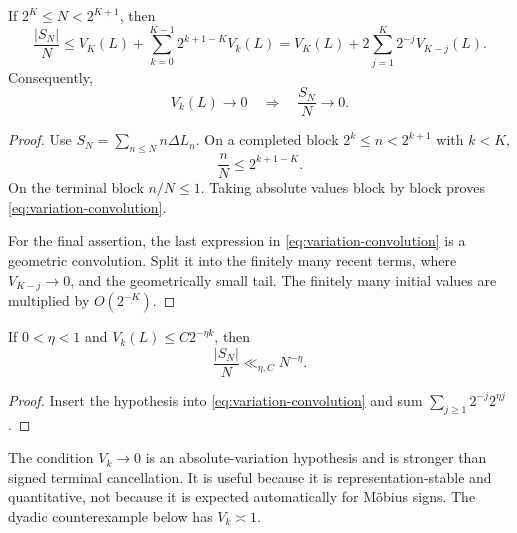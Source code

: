 \begin{theorem}
\label{thm:variation-convolution}
If \(2^K\le N<2^{K+1}\), then
\begin{equation}
 \boxed{\quad
 \frac{|S_N|}{N}
 \le
 V_K(L)+
 \sum_{k=0}^{K-1}2^{k+1-K}V_k(L)
 =
 V_K(L)+2\sum_{j=1}^{K}2^{-j}V_{K-j}(L).
 \quad}
\label{eq:variation-convolution}
\end{equation}
Consequently,
\begin{equation}
 V_k(L)\longrightarrow0
 \quad\Longrightarrow\quad
 \frac{S_N}{N}\longrightarrow0.
\label{eq:variation-sufficient}
\end{equation}
\end{theorem}

\begin{proof}
Use \(S_N=\sum_{n\le N}n\Delta L_n\).  On a completed block
\(2^k\le n<2^{k+1}\) with \(k<K\),
\[
 \frac{n}{N}\le2^{k+1-K}.
\]
On the terminal block \(n/N\le1\).  Taking absolute values block by
block proves \eqref{eq:variation-convolution}.

For the final assertion, the last expression in
\eqref{eq:variation-convolution} is a geometric convolution.  Split
it into the finitely many recent terms, where \(V_{K-j}\to0\), and
the geometrically small tail.  The finitely many initial values are
multiplied by \(O(2^{-K})\).
\end{proof}

\begin{corollary}
\label{cor:variation-power}
If \(0<\eta<1\) and \(V_k(L)\le C2^{-\eta k}\), then
\[
 \frac{|S_N|}{N}\ll_{\eta,C}N^{-\eta}.
\]
\end{corollary}

\begin{proof}
Insert the hypothesis into
\eqref{eq:variation-convolution} and sum
\(\sum_{j\ge1}2^{-j}2^{\eta j}\).
\end{proof}

\begin{remark}
\label{rem:variation-strong}
The condition \(V_k\to0\) is an absolute-variation hypothesis and is
stronger than signed terminal cancellation.  It is useful because it
is representation-stable and quantitative, not because it is
expected automatically for M\"obius signs.  The dyadic counterexample
below has \(V_k\asymp1\).
\end{remark}
